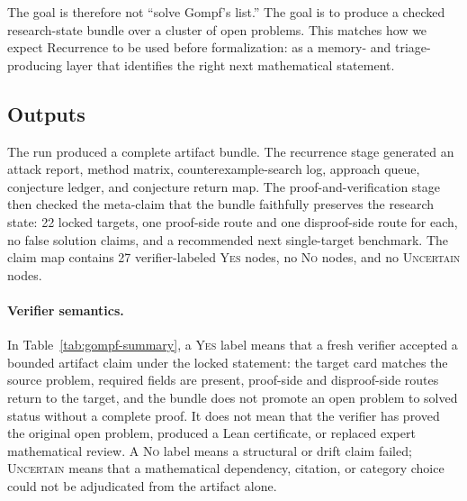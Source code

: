 \documentclass{article}
\theoremstyle{definition}
\theoremstyle{remark}
\begin{document}
The goal is therefore not ``solve Gompf's list.'' The goal is to produce a checked research-state bundle over a cluster of open problems. This matches how we expect Recurrence to be used before formalization: as a memory- and triage-producing layer that identifies the right next mathematical statement.

\subsection{Outputs}

The run produced a complete artifact bundle. The recurrence stage generated an attack report, method matrix, counterexample-search log, approach queue, conjecture ledger, and conjecture return map. The proof-and-verification stage then checked the meta-claim that the bundle faithfully preserves the research state: 22 locked targets, one proof-side route and one disproof-side route for each, no false solution claims, and a recommended next single-target benchmark. The claim map contains 27 verifier-labeled \textsc{Yes} nodes, no \textsc{No} nodes, and no \textsc{Uncertain} nodes.

\paragraph{Verifier semantics.}
In Table~\ref{tab:gompf-summary}, a \textsc{Yes} label means that a fresh verifier accepted a bounded artifact claim under the locked statement: the target card matches the source problem, required fields are present, proof-side and disproof-side routes return to the target, and the bundle does not promote an open problem to solved status without a complete proof. It does not mean that the verifier has proved the original open problem, produced a Lean certificate, or replaced expert mathematical review. A \textsc{No} label means a structural or drift claim failed; \textsc{Uncertain} means that a mathematical dependency, citation, or category choice could not be adjudicated from the artifact alone.
\end{document}
